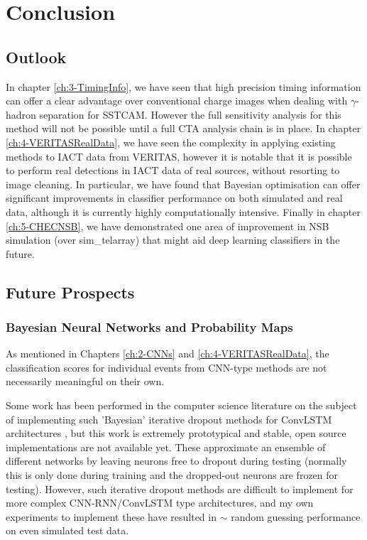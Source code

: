 \chapter{\label{ch6-Conclusions} Conclusion}
\minitoc
\section{Outlook}

In chapter \ref{ch:3-TimingInfo}, we have seen that high precision timing information can offer a clear advantage over conventional charge images when dealing with $\gamma$-hadron separation for SSTCAM. However the full sensitivity analysis for this method will not be possible until a full CTA analysis chain is in place. In chapter \ref{ch:4-VERITASRealData}, we have seen the complexity in applying existing methods to IACT data from VERITAS, however it is notable that it is possible to perform real detections in IACT data of real sources, without resorting to image cleaning. In particular, we have found that Bayesian optimisation can offer significant improvements in classifier performance on both simulated and real data, although it is currently highly computationally intensive. Finally in chapter \ref{ch:5-CHECNSB}, we have demonstrated one area of improvement in NSB simulation (over sim\_telarray) that might aid deep learning classifiers in the future.

\section{Future Prospects}

\subsection{Bayesian Neural Networks and Probability Maps}

As mentioned in Chapters \ref{ch:2-CNNs} and \ref{ch:4-VERITASRealData}, the classification scores for individual events from CNN-type methods are not necessarily meaningful on their own.

Some work has been performed in the computer science literature on the subject of implementing such 'Bayesian' iterative dropout methods for ConvLSTM architectures \cite{bayesconv},  but this work is extremely prototypical and stable, open source implementations are not available yet. These approximate an ensemble of different networks by leaving neurons free to dropout during testing (normally this is only done during training and the dropped-out neurons are frozen for testing). However, such iterative dropout methods are difficult to implement for more complex CNN-RNN/ConvLSTM type architectures, and my own experiments to implement these have resulted in $\sim$ random guessing performance on even simulated test data.

